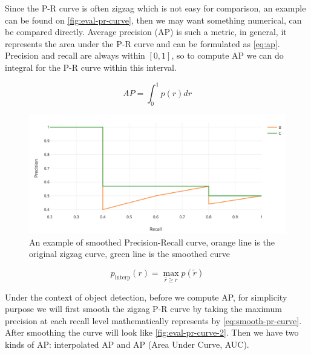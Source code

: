 Since the P-R curve is often zigzag which is not easy for comparison, an
example can be found on \autoref{fig:eval-pr-curve}, then we may want something
numerical, can be compared directly. Average precision (AP) is such a metric,
in general, it represents the area under the P-R curve and can be formulated as
\autoref{eq:ap}. Precision and recall are always within $[0, 1]$, so to compute
AP we can do integral for the P-R curve within this interval.

\begin{equation}
\label{eq:ap}
\mathit{AP} = \int_0^1p(r)dr
\end{equation}
%

\begin{figure}
    \begin{center}
        \includegraphics[scale=0.25]{figures/eval_pr_curve2.png}
    \end{center}
    \caption[{An example of smoothed Precision-Recall curve}]
    {An example of smoothed Precision-Recall curve, orange line is the original
        zigzag curve, green line is the smoothed curve}
    \label{fig:eval-pr-curve-2}
\end{figure}

\begin{equation}
\label{eq:smooth-pr-curve}
p_{\text {interp}}(r)=\max _{\widehat{r} \geq r} p(\widetilde{r})
\end{equation}

Under the context of object detection, before we compute AP, for simplicity
purpose we will first smooth the zigzag P-R curve by taking the maximum
precision at each recall level mathematically represents by
\autoref{eq:smooth-pr-curve}.
After smoothing the curve will look like \autoref{fig:eval-pr-curve-2}. Then we
have two kinds of AP: interpolated AP and AP (Area Under Curve, AUC).

